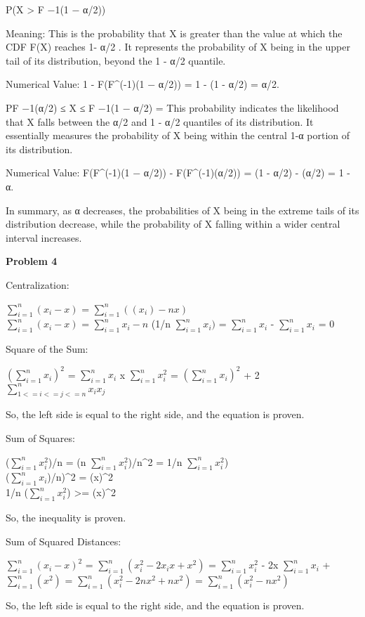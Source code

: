 \documentclass[
]{article}
\begin{document}
P(X \textgreater{} F −1(1 − α/2))

Meaning: This is the probability that X is greater than the value at
which the CDF F(X) reaches 1- α/2 . It represents the probability of X
being in the upper tail of its distribution, beyond the 1 - α/2
quantile.

Numerical Value: 1 - F(F\^{}(-1)(1 − α/2)) = 1 - (1 - α/2) = α/2.

PF −1(α/2) ≤ X ≤ F −1(1 − α/2) = This probability indicates the
likelihood that X falls between the α/2 and 1 - α/2 quantiles of its
distribution. It essentially measures the probability of X being within
the central 1-α portion of its distribution.

Numerical Value: F(F\^{}(-1)(1 − α/2)) - F(F\^{}(-1)(α/2)) = (1 - α/2) -
(α/2) = 1 - α.

In summary, as α decreases, the probabilities of X being in the extreme
tails of its distribution decrease, while the probability of X falling
within a wider central interval increases.

\textbf{Problem 4}

Centralization:

\(\sum_{i=1}^{n} (x_i - x)\) = \(\sum_{i=1}^{n} ((x_i) - nx)\)\\
\(\sum_{i=1}^{n} (x_i - x)\) = \(\sum_{i=1}^{n} x_i - n\) (1/n
\(\sum_{i=1}^{n} x_i)\) = \(\sum_{i=1}^{n} x_i\) -
\(\sum_{i=1}^{n} x_i\) = 0

Square of the Sum:

\((\sum_{i=1}^{n} x_i)^2\) = \(\sum_{i=1}^{n} x_i\) x
\(\sum_{i=1}^{n} x_i^2\) = \((\sum_{i=1}^{n} x_i)^2\) + 2
\(\sum_{1<=i<=j<=n}^{n} x_i x_j\)

So, the left side is equal to the right side, and the equation is
proven.

Sum of Squares:

(\(\sum_{i=1}^{n} x_i^2\))/n = (n \(\sum_{i=1}^{n} x_i^2\))/n\^{}2 = 1/n
\(\sum_{i=1}^{n} x_i^2\))\\
(\(\sum_{i=1}^{n} x_i\))/n)\^{}2 = (x)\^{}2\\
1/n (\(\sum_{i=1}^{n} x_i^2\)) \textgreater= (x)\^{}2

So, the inequality is proven.

Sum of Squared Distances:

\(\sum_{i=1}^{n} (x_i - x)^2\) = \(\sum_{i=1}^{n} (x_i^2 - 2x_ix +x^2)\)
= \(\sum_{i=1}^{n} x_i^2\) - 2x \(\sum_{i=1}^{n} x_i\) +
\(\sum_{i=1}^{n} (x^2)\) = \(\sum_{i=1}^{n} (x_i^2 - 2nx^2 +nx^2)\) =
\(\sum_{i=1}^{n} (x_i^2 - nx^2)\)

So, the left side is equal to the right side, and the equation is
proven.
\end{document}
